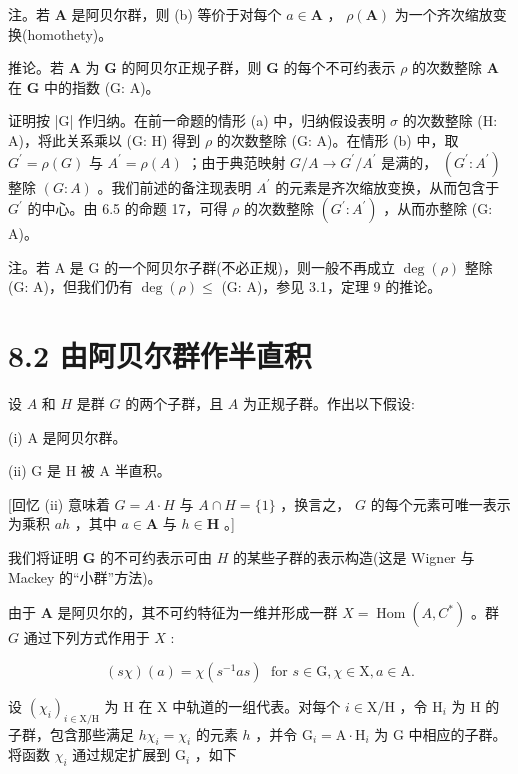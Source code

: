 \documentclass[10pt]{article}
\begin{document}
注。若 \(\mathbf{A}\) 是阿贝尔群，则 (b) 等价于对每个 \(a \in  \mathbf{A}\) ， \(\rho \left( \mathbf{A}\right)\) 为一个齐次缩放变换(homothety)。

推论。若 \(\mathbf{A}\) 为 \(\mathbf{G}\) 的阿贝尔正规子群，则 \(\mathbf{G}\) 的每个不可约表示 \(\rho\) 的次数整除 \(\mathbf{A}\) 在 \(\mathbf{G}\) 中的指数 (G: A)。

证明按 |G| 作归纳。在前一命题的情形 (a) 中，归纳假设表明 \(\sigma\) 的次数整除 (H: A)，将此关系乘以 (G: H) 得到 \(\rho\) 的次数整除 (G: A)。在情形 (b) 中，取 \({G}^{\prime } = \rho \left( G\right)\) 与 \({A}^{\prime } = \rho \left( A\right)\) ；由于典范映射 \(G/A \rightarrow  {G}^{\prime }/{A}^{\prime }\) 是满的， \(\left( {{G}^{\prime } : {A}^{\prime }}\right)\) 整除 \(\left( {G : A}\right)\) 。我们前述的备注现表明 \({A}^{\prime }\) 的元素是齐次缩放变换，从而包含于 \({G}^{\prime }\) 的中心。由 6.5 的命题 17，可得 \(\rho\) 的次数整除 \(\left( {{G}^{\prime } : {A}^{\prime }}\right)\) ，从而亦整除 (G: A)。

注。若 A 是 G 的一个阿贝尔子群(不必正规)，则一般不再成立 \(\deg \left( \rho \right)\) 整除 (G: A)，但我们仍有 \(\deg \left( \rho \right)  \leq\) (G: A)，参见 3.1，定理 9 的推论。

\section*{8.2 由阿贝尔群作半直积}

设 \(A\) 和 \(H\) 是群 \(G\) 的两个子群，且 \(A\) 为正规子群。作出以下假设:

(i) A 是阿贝尔群。

(ii) \(\mathrm{G}\) 是 \(\mathrm{H}\) 被 \(\mathrm{A}\) 半直积。

[回忆 (ii) 意味着 \(G = A \cdot  H\) 与 \(A \cap  H = \{ 1\}\) ，换言之， \(G\) 的每个元素可唯一表示为乘积 \({ah}\) ，其中 \(a \in  \mathbf{A}\) 与 \(h \in  \mathbf{H}\) 。]

我们将证明 \(\mathbf{G}\) 的不可约表示可由 \(H\) 的某些子群的表示构造(这是 Wigner 与 Mackey 的“小群”方法)。

由于 \(\mathbf{A}\) 是阿贝尔的，其不可约特征为一维并形成一群 \(X = \operatorname{Hom}\left( {A,{C}^{ * }}\right)\) 。群 \(G\) 通过下列方式作用于 \(X\) :

\[
\left( {s\chi }\right) \left( a\right)  = \chi \left( {{s}^{-1}{as}}\right) \;\text{ for }s \in  \mathrm{G},\chi  \in  \mathrm{X},a \in  \mathrm{A}.
\]

设 \({\left( {\chi }_{i}\right) }_{i \in  \mathrm{X}/\mathrm{H}}\) 为 \(\mathrm{H}\) 在 \(\mathrm{X}\) 中轨道的一组代表。对每个 \(i \in  \mathrm{X}/\mathrm{H}\) ，令 \({\mathrm{H}}_{i}\) 为 \(\mathrm{H}\) 的子群，包含那些满足 \(h{\chi }_{i} = {\chi }_{i}\) 的元素 \(h\) ，并令 \({\mathrm{G}}_{i} = \mathrm{A} \cdot  {\mathrm{H}}_{i}\) 为 G 中相应的子群。将函数 \({\chi }_{i}\) 通过规定扩展到 \({\mathrm{G}}_{i}\) ，如下
\end{document}
